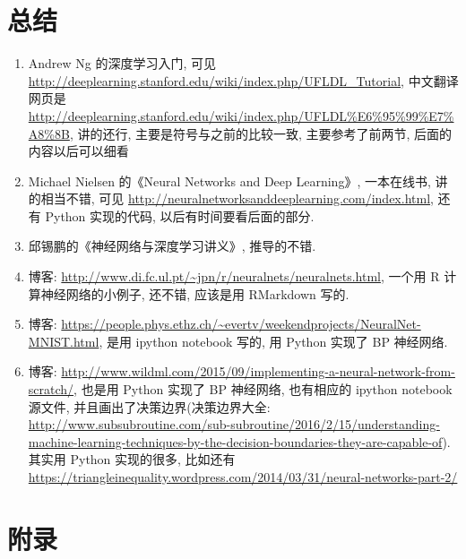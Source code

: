 \documentclass[a4paper,UTF8]{ctexart}
\theoremstyle{plain} \newtheorem{theorem}{定理}[section]
\theoremstyle{plain} \newtheorem{definition}{定义}[section]
\theoremstyle{plain} \newtheorem{lemma}{引理}[section]
\theoremstyle{plain} \newtheorem{proposition}{命题}[section]
\theoremstyle{plain} \newtheorem{example}{例}[section]
\theoremstyle{plain} \newtheorem{remark}{注}[section]
\theoremstyle{plain} \newtheorem{corollary}{推论}[section]
\begin{document}
\section{总结}
\begin{enumerate}[(1)]
\item Andrew Ng 的深度学习入门, 可见 \url{http://deeplearning.stanford.edu/wiki/index.php/UFLDL_Tutorial}, 中文翻译网页是 \url{http://deeplearning.stanford.edu/wiki/index.php/UFLDL%E6%95%99%E7%A8%8B}, 讲的还行, 主要是符号与之前的比较一致, 主要参考了前两节, 后面的内容以后可以细看

\item Michael Nielsen 的《Neural Networks and Deep Learning》, 一本在线书, 讲的相当不错, 可见 \url{http://neuralnetworksanddeeplearning.com/index.html}, 还有 Python 实现的代码, 以后有时间要看后面的部分.

\item 邱锡鹏的《神经网络与深度学习讲义》, 推导的不错.

\item 博客: \url{http://www.di.fc.ul.pt/~jpn/r/neuralnets/neuralnets.html}, 一个用 R 计算神经网络的小例子, 还不错, 应该是用 RMarkdown 写的.

\item 博客: \url{https://people.phys.ethz.ch/~evertv/weekendprojects/NeuralNet-MNIST.html}, 是用 ipython notebook 写的, 用 Python 实现了 BP 神经网络.

\item 博客: \url{http://www.wildml.com/2015/09/implementing-a-neural-network-from-scratch/}, 也是用 Python 实现了 BP 神经网络, 也有相应的 ipython notebook 源文件, 并且画出了决策边界(决策边界大全: \url{http://www.subsubroutine.com/sub-subroutine/2016/2/15/understanding-machine-learning-techniques-by-the-decision-boundaries-they-are-capable-of}). 其实用 Python 实现的很多, 比如还有 \url{https://triangleinequality.wordpress.com/2014/03/31/neural-networks-part-2/}
\end{enumerate}



\newpage

\section*{附录}
\end{document}
